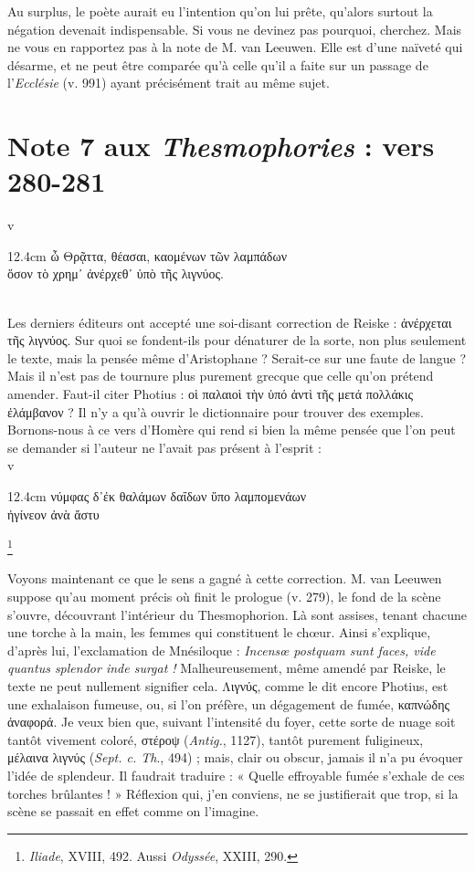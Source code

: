 \documentclass{book}%
\newcommand{\italique}[1]{\textit{#1}}%
\newcommand{\espace}[1]{\hspace{#1}}%
\newcommand{\fantome}{{\color{white}v}}
\newcommand{\Note}[1]{\section*{#1}%
\addcontentsline{toc}{section}{#1}}
\newcommand{\note}[1]{\footnote{#1}}
\newcommand{\citComm}[1]{\fantome\\
\espace{1cm}\begin{minipagewithmarginpars}{12.4cm}%
#1
\end{minipagewithmarginpars}%
}
\begin{document}
Au surplus, le poète aurait eu l'intention qu'on lui prête, qu'alors surtout la négation devenait indispensable. Si vous ne devinez pas pourquoi, cherchez. Mais ne vous en rapportez pas à la note de M. van Leeuwen. Elle est d'une naïveté qui désarme, et ne peut être comparée qu'à celle qu'il a faite sur un passage de l'\italique{Ecclésie} (v. 991) ayant précisément trait au même sujet.

\Note{Note 7 aux \italique{Thesmophories} : vers 280-281}

\citComm{ὦ Θρᾷττα, θέασαι, καομένων τῶν λαμπάδων\\
ὅσον τὸ χρημ᾽ ἀνέρχεθ᾽ ὑπὸ τῆς λιγνύος.}\\


Les derniers éditeurs ont accepté une soi-disant correction de Reiske : ἀνέρχεται τῆς λιγνύος. Sur quoi se fondent-ils pour dénaturer de la sorte, non plus seulement le texte, mais la pensée même d'Aristophane ? 
Serait-ce sur une faute de langue ? Mais il n'est pas de tournure plus purement grecque que celle qu'on prétend amender. Faut-il citer Photius : οἱ παλαιοὶ τὴν ὑπό ἀντὶ τῆς μετά πολλάκις ἐλάμβανον ? 
Il n'y a qu'à ouvrir le dictionnaire pour trouver des exemples. Bornons-nous à ce vers d'Homère qui rend si bien la même pensée que l'on peut se demander si l'auteur ne l'avait pas présent à l'esprit : \\

\citComm{νύμφας δ᾽ἐκ θαλάμων δαΐδων ὕπο λαμπομενάων\\
ἠγίνεον ἀνὰ ἄστυ}\note{\italique{Iliade}, XVIII, 492. Aussi \italique{Odyssée}, XXIII, 290.}

Voyons maintenant ce que le sens a gagné à cette correction. M. van Leeuwen suppose qu'au moment précis où finit le prologue (v. 279), le fond de la scène s'ouvre, découvrant l'intérieur du Thesmophorion. Là sont assises, tenant chacune une torche à la main, les femmes qui constituent le chœur. Ainsi s'explique, d'après lui, l'exclamation de Mnésiloque : \italique{Incensœ postquam sunt faces, vide quantus splendor inde surgat !}
Malheureusement, même amendé par Reiske, le texte ne peut nullement signifier cela. 
Λιγνύς, comme le dit encore Photius, est une exhalaison fumeuse, ou, si l'on préfère, un dégagement de fumée, καπνώδης ἀναφορά. Je veux bien que, suivant l'intensité du foyer, cette sorte de nuage soit tantôt vivement coloré, στέροψ (\italique{Antig.}, 1127), tantôt purement fuligineux, μέλαινα λιγνύς (\italique{Sept. c. Th}., 494) ; mais, clair ou obscur, jamais il n'a pu évoquer l'idée de splendeur. Il faudrait traduire : « Quelle effroyable fumée s'exhale de ces torches brûlantes ! » Réflexion qui, j'en conviens, ne se justifierait que trop, si la scène se passait en effet comme on l'imagine. 
\end{document}
